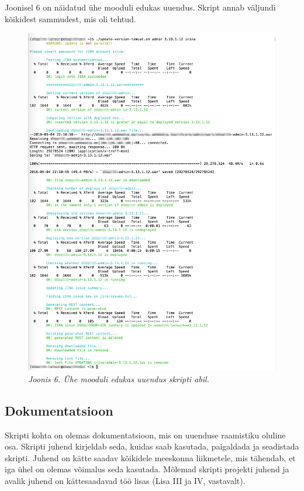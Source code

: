 \documentclass[12pt]{report}
\begin{document}
  Joonisel 6 on näidatud ühe mooduli edukas uuendus. Skript annab väljundi kõikidest sammudest, mis oli tehtud.
  
  \begin{figure}[H]
     \begin{center} 
       \includegraphics[width=.85\textwidth]{screenshots/one-module-successful-update.png}
       \caption*{\textit{Joonis 6. Ühe mooduli edukas uuendus skripti abil.}}
     \end{center}
   \end{figure}

  \subsection{Dokumentatsioon}
  
  Skripti kohta on olemas dokumentatsioon, mis on uuenduse raamistiku oluline osa. Skripti juhend kirjeldab seda, kuidas saab kasutada, paigaldada ja seadistada skripti. Juhend on kätte saadav kõikidele meeskonna liikmetele, mis tähendab, et iga ühel on olemas võimalus seda kasutada. Mõlemad skripti projekti juhend ja avalik juhend on kättesaadavad töö lisas (Lisa III ja IV, vastavalt).
  
\end{document}
